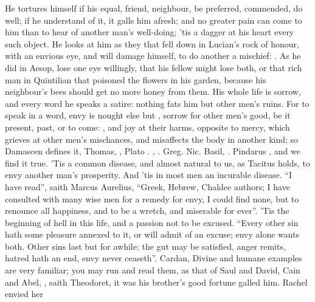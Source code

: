 He tortures himself if his equal, friend, neighbour, be preferred, commended,
do well; if he understand of it, it galls him afresh; and no greater pain can
come to him than to hear of another man's well-doing; 'tis a dagger at his
heart every such object. He looks at him as they that fell down in Lucian's
rock of honour, with an envious eye, and will damage himself, to do another a
mischief: . As he did in Aesop,
lose one eye willingly, that his fellow might lose both, or that rich man in
Quintilian that poisoned the flowers in his garden,
because his neighbour's bees should get no more honey from them. His whole life
is sorrow, and every word he speaks a satire: nothing fats him but other men's
ruins. For to speak in a word, envy is nought else but , sorrow for other men's good, be it present, past, or to come: , and joy at their harms, opposite to
mercy, which grieves at other men's mischances, and
misaffects the body in another kind; so Damascen defines it,
 Thomas,  \Aristotle{},  Plato . \Tully{}, . Greg. Nic.  Basil,
. Pindarus , and we find it true. 'Tis a common disease, and almost natural to us, as
Tacitus holds, to envy another man's prosperity. And 'tis
in most men an incurable disease. \enquote{I have read}, saith
Marcus Aurelius, \enquote{Greek, Hebrew, Chaldee authors; I have consulted with many
wise men for a remedy for envy, I could find none, but to renounce all
happiness, and to be a wretch, and miserable for ever}. 'Tis the beginning of
hell in this life, and a passion not to be excused. \enquote{Every
other sin hath some pleasure annexed to it, or will admit of an excuse; envy
alone wants both. Other sins last but for awhile; the gut may be satisfied,
anger remits, hatred hath an end, envy never ceaseth}. Cardan,
 Divine and humane examples are very
familiar; you may run and read them, as that of Saul and David, Cain and Abel,
, saith
Theodoret, it was his brother's good fortune galled him. Rachel envied her
